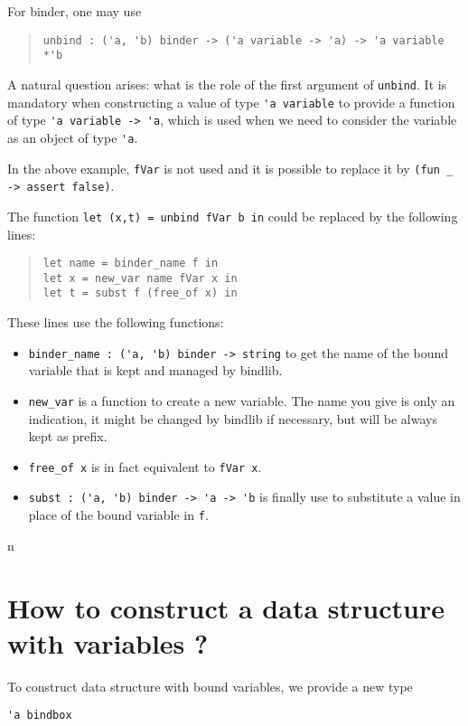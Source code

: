 \documentclass[11pt]{article}
\begin{document}
For binder, one may use
\begin{quote}
\begin{verbatim}
unbind : ('a, 'b) binder -> ('a variable -> 'a) -> 'a variable *'b
\end{verbatim}
\end{quote}
A natural question arises: what is the
role of the first argument of \verb!unbind!. It is mandatory when
constructing a value of type \verb!'a variable! to provide a function
of type \verb!'a variable -> 'a!, which is used when we need to
consider the variable as an object of type \verb!'a!.

In the above example, \verb!fVar! is not used and it is possible to
replace it by \verb!(fun _ -> assert false)!.

The function \verb!let (x,t) = unbind fVar b in! could be replaced by the following lines:
\begin{quote}
\begin{verbatim}
let name = binder_name f in
let x = new_var name fVar x in
let t = subst f (free_of x) in
\end{verbatim}
\end{quote}

These lines use the following functions:

\begin{itemize}
\item \verb#binder_name : ('a, 'b) binder -> string# to get the name
  of the bound variable that is kept and managed by bindlib.

\item \verb#new_var# is a function to create a new variable.
The name you give is only an indication, it might be changed by
bindlib if necessary, but will be always kept as prefix.

\item \verb#free_of x# is in fact equivalent to \verb#fVar x#.

\item \verb#subst : ('a, 'b) binder -> 'a -> 'b# is finally use to
  substitute a value in place of the bound variable in \verb#f#.
\end{itemize}


n\section{How to construct a data structure with variables ?}

To construct data structure with bound variables, we provide a new type
\begin{center}
\verb!'a bindbox!
\end{center}
\end{document}
